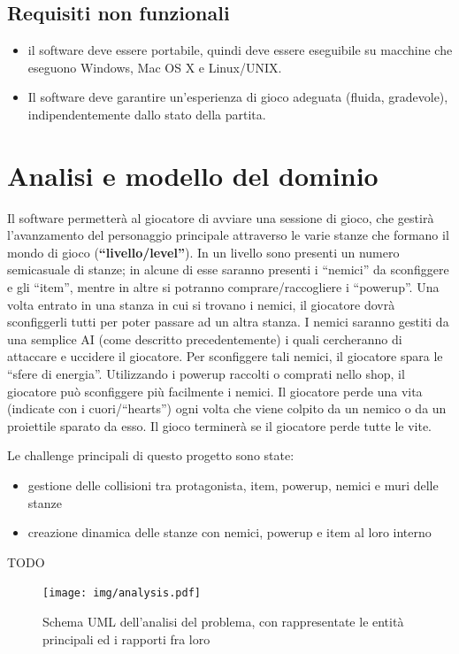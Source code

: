 \documentclass[a4paper,12pt]{report}
\begin{document}
\subsection*{Requisiti non funzionali}
\begin{itemize}
    \item il software deve essere portabile, quindi deve essere eseguibile su macchine che eseguono Windows, Mac OS X e Linux/UNIX.
    \item Il software deve garantire un'esperienza di gioco adeguata (fluida, gradevole), indipendentemente dallo stato della partita.
\end{itemize}

\newpage
\section{Analisi e modello del dominio}
Il software permetterà al giocatore di avviare una sessione di gioco, che gestirà l'avanzamento del personaggio principale attraverso le varie stanze che formano il mondo di gioco (\textbf{``livello/level''}).
In un livello sono presenti un numero semicasuale di stanze; in alcune di esse saranno presenti i ``nemici'' da sconfiggere e gli ``item'', mentre in altre si potranno comprare/raccogliere i ``powerup''.
Una volta entrato in una stanza in cui si trovano i nemici, il giocatore dovrà sconfiggerli tutti per poter passare ad un altra stanza.
I nemici saranno gestiti da una semplice AI (come descritto precedentemente) i quali cercheranno di attaccare e uccidere il giocatore. 
Per sconfiggere tali nemici, il giocatore spara le ``sfere di energia''. 
Utilizzando i powerup raccolti o comprati nello shop, il giocatore può sconfiggere più facilmente i nemici. 
Il giocatore perde una vita (indicate con i cuori/``hearts'') ogni volta che viene colpito da un nemico o da un proiettile sparato da esso.
Il gioco terminerà se il giocatore perde tutte le vite.

Le challenge principali di questo progetto sono state:
\begin{itemize}
    \item gestione delle collisioni tra protagonista, item, powerup, nemici e muri delle stanze
    \item creazione dinamica delle stanze con nemici, powerup e item al loro interno
\end{itemize}

{TODO}
\begin{figure}[H]
    \centering{}
    \texttt{[image: img/analysis.pdf]}
    \caption{Schema UML dell'analisi del problema, con rappresentate le entità principali ed i rapporti fra loro}
    \label{img:analysis}
\end{figure}
\end{document}
